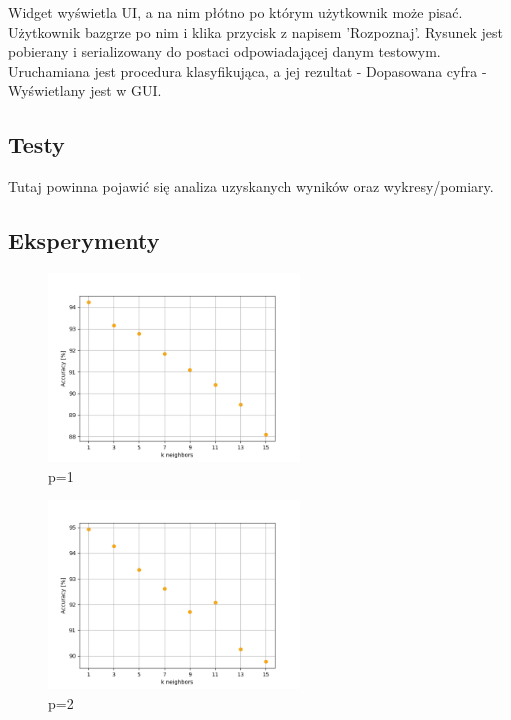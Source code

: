 \documentclass[12pt,a4paper]{article}
\begin{document}
    Widget wyświetla UI, a na nim płótno po którym użytkownik może pisać.
    Użytkownik bazgrze po nim i klika przycisk z napisem 'Rozpoznaj'. Rysunek jest pobierany i 
	serializowany do postaci odpowiadającej danym testowym. Uruchamiana jest procedura klasyfikująca, a jej 
	rezultat - Dopasowana cyfra - Wyświetlany jest w GUI.
	\subsection*{Testy}
	Tutaj powinna pojawić się analiza uzyskanych wyników oraz wykresy/pomiary.
	\subsection*{Eksperymenty}
	\begin{figure}[!htb]
		\includegraphics[height=5cm]{"knn1.png"}
		\centering
		\caption{p=1}
	\end{figure}
	\begin{figure}[!htb]
		\includegraphics[height=5cm]{"knn2.png"}
		\centering
		\caption{p=2}
	\end{figure}
\end{document}
